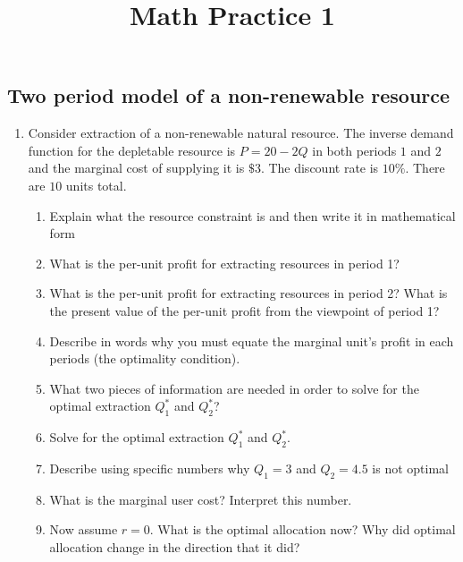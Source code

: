 \documentclass[11pt]{article}
\title{Math Practice 1}
\newcommand{\answer}[1]{\iftoggle{INCLUDEANSWERS}{{\color{violet!70!white}\textbf{Solution:} #1}}{}}
\begin{document}
\subsection*{Two period model of a non-renewable resource}

\begin{enumerate}
  \item Consider extraction of a non-renewable natural resource. The inverse demand function for the depletable resource is $P = 20 - 2Q$ in both periods $1$ and $2$ and the marginal cost of supplying it is $\$3$. The discount rate is $10\%$. There are $10$ units total.

  \begin{enumerate}
    \item Explain what the resource constraint is and then write it in mathematical form

    \item What is the per-unit profit for extracting resources in period 1? 
    
    \item What is the per-unit profit for extracting resources in period 2? What is the present value of the per-unit profit from the viewpoint of period 1?

    \item Describe in words why you must equate the marginal unit's profit in each periods (the optimality condition). 
    
    \item What two pieces of information are needed in order to solve for the optimal extraction $Q_1^*$ and $Q_2^*$?
    
    \item Solve for the optimal extraction $Q_1^*$ and $Q_2^*$.
    
    \item Describe using specific numbers why $Q_1 = 3$ and $Q_2 = 4.5$ is not optimal

    \item What is the marginal user cost? Interpret this number.

    \item Now assume $r = 0$. What is the optimal allocation now? Why did optimal allocation change in the direction that it did?
  \end{enumerate}

  \answer{
    \begin{enumerate}
      \item The resource constraint is that the amount I extract in period 1 plus the amount I extract in period 2 must add up to the supply of 10. 
      $$Q_1 + Q_2 = 10$$
  

\end{enumerate}}
\end{enumerate}
\end{document}
